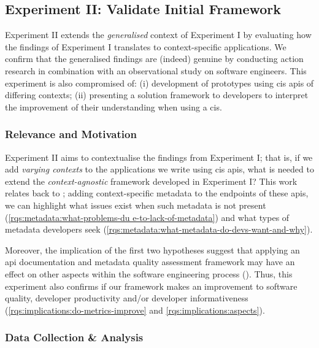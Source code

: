 \subsection{Experiment II: Validate Initial Framework}
\label{ssec:research-methodology:experiments:2}

Experiment II extends the \textit{generalised} context of Experiment I by evaluating how the findings of Experiment I translates to context-specific applications. We confirm that the generalised findings are (indeed) genuine by conducting action research in combination with an observational study on software engineers. This experiment is also compromised of: (i) development of prototypes using \gls{cis} \glspl{api} of differing contexts; (ii) presenting a solution framework to developers to interpret the improvement of their understanding when using a \gls{cis}.

\subsubsection{Relevance and Motivation}

Experiment II aims to contextualise the findings from Experiment I; that is, if we add \textit{varying contexts} to the applications we write using \gls{cis} \glspl{api}, what is needed to extend the \textit{context-agnostic} framework developed in Experiment I? This work relates back to ; adding context-specific metadata to the endpoints of these \glspl{api}, we can highlight what issues exist when such metadata is not present (\ref{rqs:metadata:what-problems-du                                                                e-to-lack-of-metadata}) and what types of metadata developers seek (\ref{rqs:metadata:what-metadata-do-devs-want-and-why}).

Moreover, the implication of the first two hypotheses suggest that applying an \gls{api} documentation and metadata quality assessment framework may have an effect on other aspects within the software engineering process (). Thus, this experiment also confirms if our framework makes an improvement to software quality, developer productivity and/or developer informativeness (\ref{rqs:implications:do-metrics-improve} and \ref{rqs:implications:aspects}).

\subsubsection{Data Collection \& Analysis}

